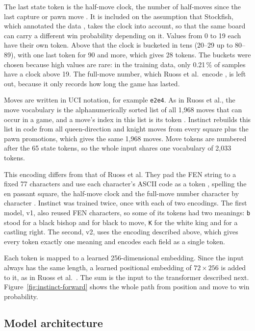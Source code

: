 The last state token is the half-move clock, the number of half-moves since the last capture or pawn move \cite{pythonchess}.
It is included on the assumption that Stockfish, which annotated the data \cite{Ruoss2024}, takes the clock into account, so that the same board can carry a different win probability depending on it.
Values from 0 to 19 each have their own token.
Above that the clock is bucketed in tens (20--29 up to 80--89), with one last token for 90 and more, which gives 28 tokens.
The buckets were chosen because high values are rare: in the training data, only 0.21\,\% of samples have a clock above 19.
The full-move number, which Ruoss et al.\ encode \cite{Ruoss2024}, is left out, because it only records how long the game has lasted.

Moves are written in \ac{UCI} notation, for example \texttt{e2e4}.
As in Ruoss et al., the move vocabulary is the alphanumerically sorted list of all 1,968 moves that can occur in a game, and a move's index in this list is its token \cite{Ruoss2024}.
Instinct rebuilds this list in code from all queen-direction and knight moves from every square plus the pawn promotions, which gives the same 1,968 moves.
Move tokens are numbered after the 65 state tokens, so the whole input shares one vocabulary of 2,033 tokens.

This encoding differs from that of Ruoss et al. They pad the \ac{FEN} string to a fixed 77 characters and use each character's ASCII code as a token \cite{Ruoss2024}, spelling the en passant square, the half-move clock and the full-move number character by character \cite{Ruoss2024}.
Instinct was trained twice, once with each of two encodings.
The first model, v1, also reused \ac{FEN} characters, so some of its tokens had two meanings: \texttt{b} stood for a black bishop and for black to move, \texttt{K} for the white king and for a castling right.
The second, v2, uses the encoding described above, which gives every token exactly one meaning and encodes each field as a single token.

Each token is mapped to a learned 256-dimensional embedding.
Since the input always has the same length, a learned positional embedding of $72 \times 256$ is added to it, as in Ruoss et al.\ \cite{Ruoss2024}.
The sum is the input to the transformer described next.
Figure~\ref{fig:instinct-forward} shows the whole path from position and move to win probability.

\subsection{Model architecture}
\label{subsec:architecture}

